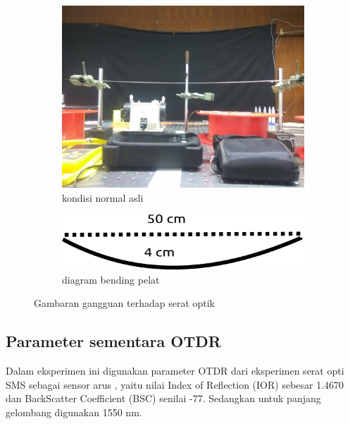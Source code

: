\documentclass[12pt]{article}
\begin{document}
\begin{enumerate}
			\begin{figure}[h!]
				\centering
				\captionsetup{justification=centering}
				\begin{subfigure}[b]{0.2\textwidth}
					\includegraphics[width=\textwidth]{images/Bab_4/Bab_4_2a}	
					\caption{\small{kondisi normal asli}}		
				\end{subfigure}
				\begin{subfigure}[b]{0.2\textwidth}
					\includegraphics[width=\linewidth]{images/Bab_4/Bab_4_2b}
					\caption{\small{diagram bending pelat}}			
				\end{subfigure}
				\caption[Uji Peturbasi]{\small{Gambaran gangguan terhadap serat optik }}
			\end{figure}
		
	\end{enumerate}

	\subsection{Parameter sementara OTDR}
	
	Dalam eksperimen ini digunakan parameter OTDR dari eksperimen serat opti SMS sebagai sensor arus \cite{Hafid2014},
	yaitu nilai Index of Reflection (IOR) sebesar 1.4670 dan BackScatter Coefficient (BSC) senilai -77.
	Sedangkan untuk panjang gelombang digunakan 1550 nm. 
	
\end{document}
